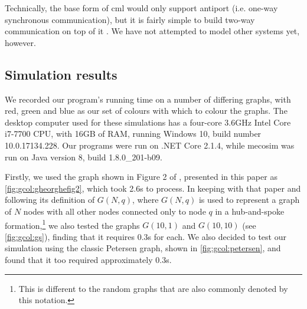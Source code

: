 Technically, the base form of \gls{cml} would only support antiport (i.e. one-way synchronous communication), but it is fairly simple to build two-way communication on top of it \cite[ch.~6]{Reppy2007}.  We have not attempted to model other systems yet, however.

\subsection{Simulation results}
We recorded our program's running time on a number of differing graphs, with red, green and blue as our set of colours with which to colour the graphs.  The desktop computer used for these simulations has a four-core 3.6GHz Intel Core i7-7700 CPU, with 16GB of RAM, running Windows 10, build number 10.0.17134.228.  Our \fsharp{} programs were run on .NET Core 2.1.4, while \gls{mecosim} was run on Java version 8, build 1.8.0\_201-b09. 


Firstly, we used the graph shown in Figure 2 of \cite{Gheorghe2013}, presented in this paper as \autoref{fig:gcol:gheorghefig2}, which took 2.6s to process.  In keeping with that paper and following its definition of \(G(N,q)\), where \(G(N,q)\) is used to represent a graph of \(N\) nodes with all other nodes connected only to node \(q\) in a hub-and-spoke formation,\footnote{This is different to the random graphs that are also commonly denoted by this notation.} we also tested the graphs \(G(10,1)\) and \(G(10,10)\) (see \autoref{fig:gcol:gs}), finding that it requires 0.3s for each.  We also decided to test our simulation using the classic Petersen graph, shown in \autoref{fig:gcol:petersen}, and found that it too required approximately 0.3s.


